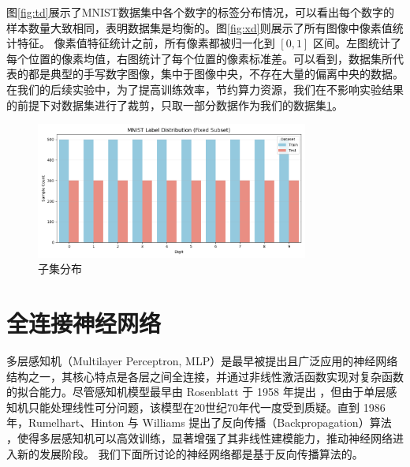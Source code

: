 \documentclass[12pt,a4paper]{article}
\begin{document}
图\ref{fig:td}展示了MNIST数据集中各个数字的标签分布情况，可以看出每个数字的样本数量大致相同，表明数据集是均衡的。图\ref{fig:xd}则展示了所有图像中像素值统计特征。
像素值特征统计之前，所有像素都被归一化到 $[0, 1]$ 区间。左图统计了每个位置的像素均值，右图统计了每个位置的像素标准差。可以看到，数据集所代表的都是典型的手写数字图像，集中于图像中央，不存在大量的偏离中央的数据。
在我们的后续实验中，为了提高训练效率，节约算力资源，我们在不影响实验结果的前提下对数据集进行了裁剪，只取一部分数据作为我们的数据集\ref{fig:sssss}。
\begin{figure}[h]
    \centering
    \includegraphics[width=0.8\textwidth]{../images/zjfb.png}
    \caption{子集分布}
    \label{fig:sssss}
\end{figure}
\section{全连接神经网络}
多层感知机（Multilayer Perceptron, MLP）是最早被提出且广泛应用的神经网络结构之一，其核心特点是各层之间全连接，并通过非线性激活函数实现对复杂函数的拟合能力。尽管感知机模型最早由 Rosenblatt 于 1958 年提出 \cite{Rosenblatt1958}，但由于单层感知机只能处理线性可分问题，该模型在20世纪70年代一度受到质疑。直到 1986 年，Rumelhart、Hinton 与 Williams 提出了反向传播（Backpropagation）算法 \cite{Rumelhart1986}，使得多层感知机可以高效训练，显著增强了其非线性建模能力，推动神经网络进入新的发展阶段。
我们下面所讨论的神经网络都是基于反向传播算法的。
\end{document}
